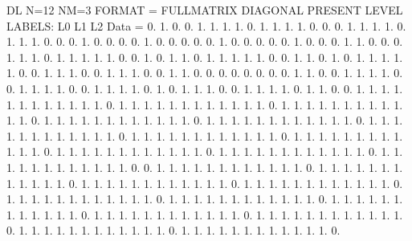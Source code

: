 DL
N=12 NM=3
FORMAT = FULLMATRIX DIAGONAL PRESENT
LEVEL LABELS:
L0
L1
L2
Data =
0. 1. 0. 0. 1. 1. 1. 1. 0. 1. 1. 1.
 1. 0. 0. 0. 1. 1. 1. 1. 0. 1. 1. 1.
 0. 0. 0. 1. 0. 0. 0. 0. 1. 0. 0. 0.
 0. 0. 1. 0. 0. 0. 0. 0. 1. 0. 0. 0.
 1. 1. 0. 0. 0. 1. 1. 1. 0. 1. 1. 1.
 1. 1. 0. 0. 1. 0. 1. 1. 0. 1. 1. 1.
 1. 1. 0. 0. 1. 1. 0. 1. 0. 1. 1. 1.
 1. 1. 0. 0. 1. 1. 1. 0. 0. 1. 1. 1.
 0. 0. 1. 1. 0. 0. 0. 0. 0. 0. 0. 0.
 1. 1. 0. 0. 1. 1. 1. 1. 0. 0. 1. 1.
 1. 1. 0. 0. 1. 1. 1. 1. 0. 1. 0. 1.
 1. 1. 0. 0. 1. 1. 1. 1. 0. 1. 1. 0.
0. 1. 1. 1. 1. 1. 1. 1. 1. 1. 1. 1.
 1. 0. 1. 1. 1. 1. 1. 1. 1. 1. 1. 1.
 1. 1. 0. 1. 1. 1. 1. 1. 1. 1. 1. 1.
 1. 1. 1. 0. 1. 1. 1. 1. 1. 1. 1. 1.
 1. 1. 1. 1. 0. 1. 1. 1. 1. 1. 1. 1.
 1. 1. 1. 1. 1. 0. 1. 1. 1. 1. 1. 1.
 1. 1. 1. 1. 1. 1. 0. 1. 1. 1. 1. 1.
 1. 1. 1. 1. 1. 1. 1. 0. 1. 1. 1. 1.
 1. 1. 1. 1. 1. 1. 1. 1. 0. 1. 1. 1.
 1. 1. 1. 1. 1. 1. 1. 1. 1. 0. 1. 1.
 1. 1. 1. 1. 1. 1. 1. 1. 1. 1. 0. 1.
 1. 1. 1. 1. 1. 1. 1. 1. 1. 1. 1. 0.
0. 1. 1. 1. 1. 1. 1. 1. 1. 1. 1. 1.
 1. 0. 1. 1. 1. 1. 1. 1. 1. 1. 1. 1.
 1. 1. 0. 1. 1. 1. 1. 1. 1. 1. 1. 1.
 1. 1. 1. 0. 1. 1. 1. 1. 1. 1. 1. 1.
 1. 1. 1. 1. 0. 1. 1. 1. 1. 1. 1. 1.
 1. 1. 1. 1. 1. 0. 1. 1. 1. 1. 1. 1.
 1. 1. 1. 1. 1. 1. 0. 1. 1. 1. 1. 1.
 1. 1. 1. 1. 1. 1. 1. 0. 1. 1. 1. 1.
 1. 1. 1. 1. 1. 1. 1. 1. 0. 1. 1. 1.
 1. 1. 1. 1. 1. 1. 1. 1. 1. 0. 1. 1.
 1. 1. 1. 1. 1. 1. 1. 1. 1. 1. 0. 1.
 1. 1. 1. 1. 1. 1. 1. 1. 1. 1. 1. 0.
